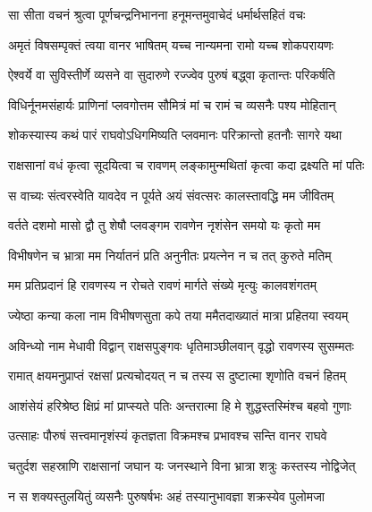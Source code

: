 
\twolineshloka
{सा सीता वचनं श्रुत्वा पूर्णचन्द्रनिभानना}
{हनूमन्तमुवाचेदं धर्मार्थसहितं वचः} %

\twolineshloka
{अमृतं विषसम्पृक्तं त्वया वानर भाषितम्}
{यच्च नान्यमना रामो यच्च शोकपरायणः} %

\twolineshloka
{ऐश्वर्ये वा सुविस्तीर्णे व्यसने वा सुदारुणे}
{रज्ज्वेव पुरुषं बद्ध्वा कृतान्तः परिकर्षति} %

\twolineshloka
{विधिर्नूनमसंहार्यः प्राणिनां प्लवगोत्तम}
{सौमित्रं मां च रामं च व्यसनैः पश्य मोहितान्} %

\twolineshloka
{शोकस्यास्य कथं पारं राघवोऽधिगमिष्यति}
{प्लवमानः परिक्रान्तो हतनौः सागरे यथा} %

\twolineshloka
{राक्षसानां वधं कृत्वा सूदयित्वा च रावणम्}
{लङ्कामुन्मथितां कृत्वा कदा द्रक्ष्यति मां पतिः} %

\twolineshloka
{स वाच्यः संत्वरस्वेति यावदेव न पूर्यते}
{अयं संवत्सरः कालस्तावद्धि मम जीवितम्} %

\twolineshloka
{वर्तते दशमो मासो द्वौ तु शेषौ प्लवङ्गम}
{रावणेन नृशंसेन समयो यः कृतो मम} %

\twolineshloka
{विभीषणेन च भ्रात्रा मम निर्यातनं प्रति}
{अनुनीतः प्रयत्नेन न च तत् कुरुते मतिम्} %

\twolineshloka
{मम प्रतिप्रदानं हि रावणस्य न रोचते}
{रावणं मार्गते संख्ये मृत्युः कालवशंगतम्} %

\twolineshloka
{ज्येष्ठा कन्या कला नाम विभीषणसुता कपे}
{तया ममैतदाख्यातं मात्रा प्रहितया स्वयम्} %

\twolineshloka
{अविन्ध्यो नाम मेधावी विद्वान् राक्षसपुङ्गवः}
{धृतिमाञ्छीलवान् वृद्धो रावणस्य सुसम्मतः} %

\twolineshloka
{रामात् क्षयमनुप्राप्तं रक्षसां प्रत्यचोदयत्}
{न च तस्य स दुष्टात्मा शृणोति वचनं हितम्} %

\twolineshloka
{आशंसेयं हरिश्रेष्ठ क्षिप्रं मां प्राप्स्यते पतिः}
{अन्तरात्मा हि मे शुद्धस्तस्मिंश्च बहवो गुणाः} %

\twolineshloka
{उत्साहः पौरुषं सत्त्वमानृशंस्यं कृतज्ञता}
{विक्रमश्च प्रभावश्च सन्ति वानर राघवे} %

\twolineshloka
{चतुर्दश सहस्राणि राक्षसानां जघान यः}
{जनस्थाने विना भ्रात्रा शत्रुः कस्तस्य नोद्विजेत्} %

\twolineshloka
{न स शक्यस्तुलयितुं व्यसनैः पुरुषर्षभः}
{अहं तस्यानुभावज्ञा शक्रस्येव पुलोमजा} %

